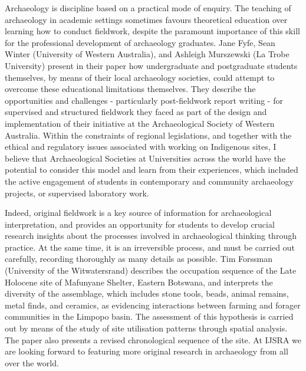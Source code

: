 Archaeology is discipline based on a practical mode of enquiry. The teaching of archaeology in academic settings sometimes favours theoretical education over learning how to conduct fieldwork, despite the paramount importance of this skill for the professional development of archaeology graduates. Jane Fyfe, Sean Winter (University of Western Australia), and Ashleigh Murszewski (La Trobe University) present in their paper how undergraduate and postgraduate students themselves, by means of their local archaeology societies, could attempt to overcome these educational limitations themselves. They describe the opportunities and challenges - particularly post-fieldwork report writing - for supervised and structured fieldwork they faced as part of the design and implementation of their initiative at the Archaeological Society of Western Australia. Within the constraints of regional legislations, and together with the ethical and regulatory issues associated with working on Indigenous sites, I believe that Archaeological Societies at Universities across the world have the potential to consider this model and learn from their experiences, which included the active engagement of students in contemporary and community archaeology projects, or supervised laboratory work.

Indeed, original fieldwork is a key source of information for archaeological interpretation, and provides an opportunity for students to develop crucial research insights about the processes involved in archaeological thinking through practice. At the same time, it is an irreversible process, and must be carried out carefully, recording thoroughly as many details as possible. Tim Forssman (University of the Witwatersrand) describes the occupation sequence of the Late Holocene site of Mafunyane Shelter, Eastern Botswana, and interprets the diversity of the assemblage, which includes stone tools, beads, animal remains, metal finds, and ceramics, as evidencing interactions between farming and forager communities in the Limpopo basin. The assessment of this hypothesis is carried out by means of the study of site utilisation patterns through spatial analysis. The paper also presents a revised chronological sequence of the site. At IJSRA we are looking forward to featuring more original research in archaeology from all over the world. 

